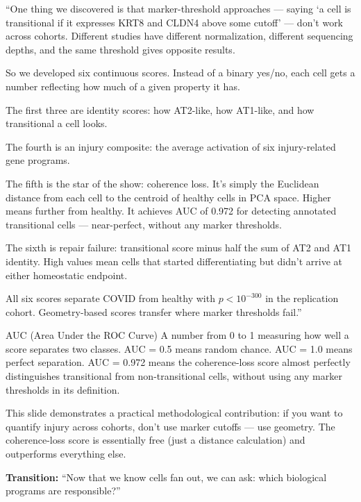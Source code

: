 \documentclass[11pt]{article}
\begin{document}
\begin{speaknote}
``One thing we discovered is that marker-threshold approaches --- saying `a cell is transitional if it expresses KRT8 and CLDN4 above some cutoff' --- don't work across cohorts. Different studies have different normalization, different sequencing depths, and the same threshold gives opposite results.

So we developed six continuous scores. Instead of a binary yes/no, each cell gets a number reflecting how much of a given property it has.

The first three are identity scores: how AT2-like, how AT1-like, and how transitional a cell looks.

The fourth is an injury composite: the average activation of six injury-related gene programs.

The fifth is the star of the show: coherence loss. It's simply the Euclidean distance from each cell to the centroid of healthy cells in PCA space. Higher means further from healthy. It achieves AUC of 0.972 for detecting annotated transitional cells --- near-perfect, without any marker thresholds.

The sixth is repair failure: transitional score minus half the sum of AT2 and AT1 identity. High values mean cells that started differentiating but didn't arrive at either homeostatic endpoint.

All six scores separate COVID from healthy with $p < 10^{-300}$ in the replication cohort. Geometry-based scores transfer where marker thresholds fail.''
\end{speaknote}

\begin{jargon}{AUC (Area Under the ROC Curve)}
A number from 0 to 1 measuring how well a score separates two classes. AUC = 0.5 means random chance. AUC = 1.0 means perfect separation. AUC = 0.972 means the coherence-loss score almost perfectly distinguishes transitional from non-transitional cells, without using any marker thresholds in its definition.
\end{jargon}

\begin{whyblock}
This slide demonstrates a practical methodological contribution: if you want to quantify injury across cohorts, don't use marker cutoffs --- use geometry. The coherence-loss score is essentially free (just a distance calculation) and outperforms everything else.
\end{whyblock}

\textbf{Transition:} ``Now that we know cells fan out, we can ask: which biological programs are responsible?''
\end{document}
